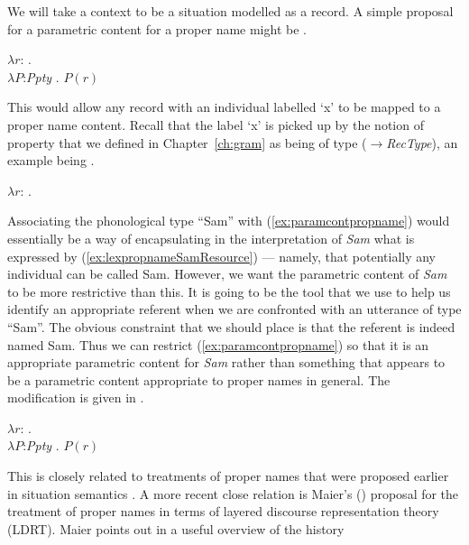 We will take a context to be a situation
modelled as a record.  A simple proposal for a parametric content for
a proper name might be \nexteg{}.
\begin{ex} 
$\lambda r$: . \\
\hspace*{1em}$\lambda P$:\textit{Ppty} . $P(r)$
\label{ex:paramcontpropname} 
\end{ex} 
This would allow any record with an individual labelled `x' to be
mapped to a proper name content.  Recall that the label `x' is picked
up by the notion of property that we defined in Chapter~\ref{ch:gram}
as being of type
($\rightarrow$\textit{RecType}),
an example being \nexteg{}. 
\begin{ex} 
$\lambda r$: .  
\end{ex} 
Associating the phonological type ``Sam'' with
(\ref{ex:paramcontpropname}) would essentially be a way of
encapsulating in the interpretation of \textit{Sam} what is expressed
by (\ref{ex:lexpropnameSamResource}) --- namely, that potentially any
individual can be called Sam.  However, we want the parametric content of
\textit{Sam} to be
more restrictive than this.  It is going to be the tool that we use to
help us identify an appropriate referent when we are confronted with
an utterance of type ``Sam''.  The obvious constraint that we should
place is that the referent is indeed named Sam.  Thus we can restrict
(\ref{ex:paramcontpropname}) so that it is an appropriate parametric
content for \textit{Sam} rather than something that appears to be a
parametric content appropriate to proper names in general.  The
modification is given in \nexteg{}.
\begin{ex} 
$\lambda r$: . \\
\hspace*{5em}$\lambda P$:\textit{Ppty} . $P(r)$ 
\label{ex:parametricSam}
\end{ex} 
This is closely related to treatments of proper
names that were proposed earlier in situation semantics
\citep{GawronPeters1990,Cooper1991,BarwiseCooper1993}.  A more recent
close relation is Maier's (\citeyear{Maier2009}) proposal for the
treatment of proper names in terms of layered discourse representation
theory (LDRT).  Maier points out in a useful overview of the history
